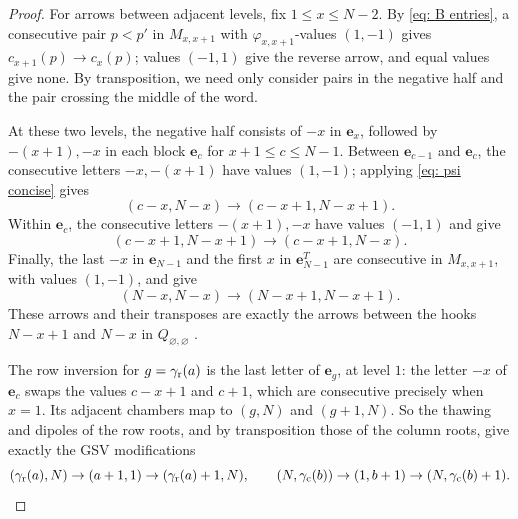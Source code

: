 \documentclass[a4paper]{amsart}
\numberwithin{equation}{section}
\theoremstyle{definition}
\theoremstyle{remark}
\newcommand{\rr}{{\rm r}}
\newcommand{\cc}{{\rm c}}
\begin{document}
\begin{proof}
  For arrows between adjacent levels, fix $1\le x\le N-2$.
  By \eqref{eq: B entries}, a consecutive pair $p<p'$ in $M_{x,x+1}$ with $\varphi_{x,x+1}$-values $(1,-1)$ gives $c_{x+1}(p)\to c_x(p)$; values $(-1,1)$ give the reverse arrow, and equal values give none.
  By transposition, we need only consider pairs in the negative half and the pair crossing the middle of the word.

  At these two levels, the negative half consists of $-x$ in $\mathbf e_x$, followed by $-(x+1),-x$ in each block $\mathbf e_c$ for $x+1\le c\le N-1$.
  Between $\mathbf e_{c-1}$ and $\mathbf e_c$, the consecutive letters $-x,-(x+1)$ have values $(1,-1)$; applying \eqref{eq: psi concise} gives
  \[
    (c-x,N-x)\longrightarrow(c-x+1,N-x+1).
  \]
  Within $\mathbf e_c$, the consecutive letters $-(x+1),-x$ have values $(-1,1)$ and give
  \[
    (c-x+1,N-x+1)\longrightarrow(c-x+1,N-x).
  \]
  Finally, the last $-x$ in $\mathbf e_{N-1}$ and the first $x$ in $\mathbf e_{N-1}^T$ are consecutive in $M_{x,x+1}$, with values $(1,-1)$, and give
  \[
    (N-x,N-x)\longrightarrow(N-x+1,N-x+1).
  \]
  These arrows and their transposes are exactly the arrows between the hooks $N-x+1$ and $N-x$ in $Q_{\varnothing,\varnothing}$ \cite[Section~4.3 and Figure~5]{GSV23}.

  The row inversion for $g=\gamma_{\rr}(a)$ is the last letter of $\mathbf e_g$, at level $1$: the letter $-x$ of $\mathbf e_c$ swaps the values $c-x+1$ and $c+1$, which are consecutive precisely when $x=1$.
  Its adjacent chambers map to $(g,N)$ and $(g+1,N)$.
  So the thawing and dipoles of the row roots, and by transposition those of the column roots, give exactly the GSV modifications
  \begin{equation}
    \label{eq: GSV arrows concise}
    (\gamma_{\rr}(a),N)\to(a+1,1)\to(\gamma_{\rr}(a)+1,N),\qquad
    (N,\gamma_{\cc}(b))\to(1,b+1)\to(N,\gamma_{\cc}(b)+1).
  \end{equation}


\end{proof}
\end{document}
